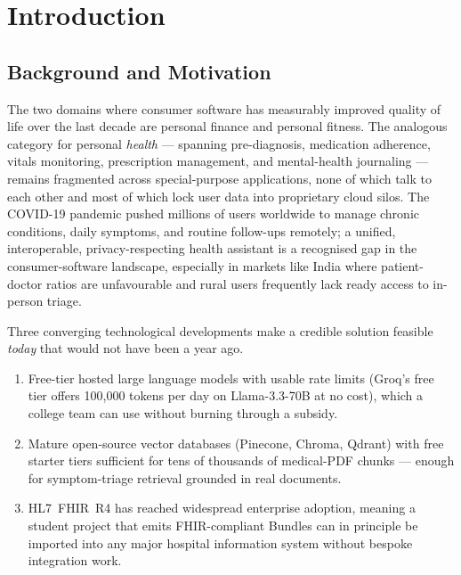 \documentclass[12pt]{caltech_thesis}
\begin{document}
\tableofcontents
\listoffigures
\listoftables

\mainmatter


\chapter{Introduction}
\label{ch:intro}

\section{Background and Motivation}

The two domains where consumer software has measurably improved quality of
life over the last decade are personal finance and personal fitness. The
analogous category for personal \textit{health} --- spanning pre-diagnosis,
medication adherence, vitals monitoring, prescription management, and
mental-health journaling --- remains fragmented across special-purpose
applications, none of which talk to each other and most of which lock user
data into proprietary cloud silos. The COVID-19 pandemic pushed millions of
users worldwide to manage chronic conditions, daily symptoms, and routine
follow-ups remotely; a unified, interoperable, privacy-respecting health
assistant is a recognised gap in the consumer-software landscape, especially
in markets like India where patient-doctor ratios are unfavourable and rural
users frequently lack ready access to in-person triage.

Three converging technological developments make a credible solution
feasible \textit{today} that would not have been a year ago.
\begin{enumerate}[label=(\alph*)]
    \item Free-tier hosted large language models with usable rate limits
    (Groq's free tier offers 100{,}000 tokens per day on Llama-3.3-70B at
    no cost), which a college team can use without burning through a
    subsidy.
    \item Mature open-source vector databases (Pinecone, Chroma, Qdrant)
    with free starter tiers sufficient for tens of thousands of medical-PDF
    chunks --- enough for symptom-triage retrieval grounded in real
    documents.
    \item HL7~FHIR~R4 has reached widespread enterprise adoption, meaning a
    student project that emits FHIR-compliant Bundles can in principle be
    imported into any major hospital information system without bespoke
    integration work.
\end{enumerate}
\end{document}
